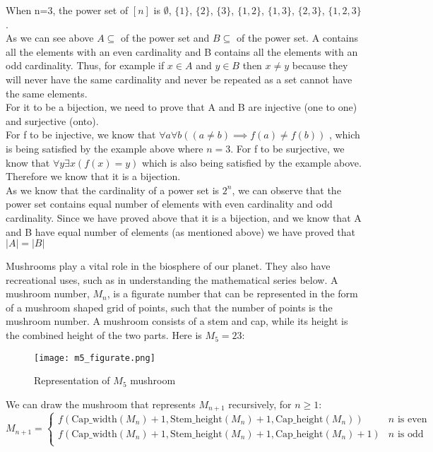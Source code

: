 \documentclass[addpoints]{exam}
\begin{document}
\begin{questions}
  \begin{solution}
    When n=3, the power set of $[n]$ is ${\emptyset}$, $\{1\}$, $\{2\}$, $\{3\}$, $\{1,2\}$, $\{1,3\}$, $\{2,3\}$, $\{1,2,3\}$. \\
    As we can see above $A \subseteq$ of the power set and $B \subseteq$ of the power set. A contains all the elements with an even cardinality and B contains all the elements with an odd cardinality. Thus, for example if $x \in A$ and $y \in B$ then $x \neq y$ because they will never have the same cardinality and never be repeated as a set cannot have the same elements.\\
    For it to be a bijection, we need to prove that A and B are injective (one to one) and surjective (onto).\\ For f to be injective, we know that $\forall a \forall b ((a \neq b) \implies f(a) \neq f(b))$ , which is being satisfied by the example above where $n=3$. For f to be surjective, we know that $\forall y \exists x(f(x)=y) $ which is also being satisfied by the example above.  Therefore we know that it is a bijection.\\
    As we know that the cardinality of a power set is $2^n$, we can observe that the power set contains equal number of elements with even cardinality and odd cardinality. Since we have proved above that it is  a bijection, and we know that A and B have equal number of elements (as mentioned above) we have proved that  $|A| = |B|$ 
    \end{solution}
  
\question Mushrooms play a vital role in the biosphere of our planet. They also have recreational uses, such as in understanding the mathematical series below. A mushroom number, $M_n$, is a figurate number that can be represented in the form of a mushroom shaped grid of points, such that the number of points is the mushroom number. A mushroom consists of a stem and cap, while its height is the combined height of the two parts. Here is $M_5=23$:

\begin{figure}[h]
  \centering
  \texttt{[image: m5\_figurate.png]}
  \caption{Representation of $M_5$ mushroom}
  \label{fig:mushroom_anatomy}
\end{figure}

We can draw the mushroom that represents $M_{n+1}$ recursively, for $n \geq 1$:
\[ 
    M_{n+1}=
    \begin{cases} 
      f(\textrm{Cap\_width}(M_n) + 1, \textrm{Stem\_height}(M_n) + 1, \textrm{Cap\_height}(M_n))  & n \textrm{ is even} \\
      f(\textrm{Cap\_width}(M_n) + 1, \textrm{Stem\_height}(M_n) + 1, \textrm{Cap\_height}(M_n)+1) & n \textrm{ is odd}  \\      
   \end{cases}
\]


\end{questions}
\end{document}
